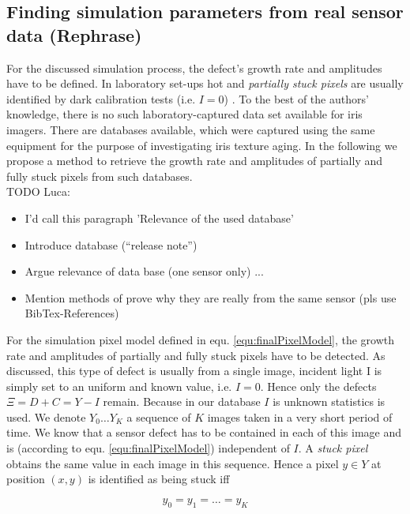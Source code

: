 \documentclass[10pt,twocolumn,letterpaper]{article}
\begin{document}
 
 \subsection{Finding simulation parameters from real sensor data (Rephrase)}
 \label{hotPixelRate}
 For the discussed simulation process, the defect's growth rate and amplitudes have to be defined. In laboratory set-ups hot and \emph{partially stuck pixels} are usually identified by dark calibration tests (i.e. $I=0$) \cite{defectIdentification}. To the best of the authors' knowledge, there is no such laboratory-captured data set available for iris imagers. There are databases \cite{czajkaTemplateAging, agedIris} available, which were captured using the same equipment for the purpose of investigating iris texture aging. In the following we propose a method to retrieve the growth rate and amplitudes of partially and fully stuck pixels from such databases.
 \\
TODO Luca:
\begin{itemize}
 \item I'd call this paragraph 'Relevance of the used database'
 \item Introduce database (``release note'')
 \item Argue relevance of data base (one sensor only) ... 
 \item Mention methods of prove why they are really from the same sensor (pls use BibTex-References)
\end{itemize}

For the simulation pixel model defined in equ. \ref{equ:finalPixelModel}, the growth rate and amplitudes of partially and fully stuck pixels have to be detected. As discussed, this type of defect is usually from a single image, incident light I is simply set to an uniform and known value, i.e. $I=0$. Hence only the defects $\Xi = D+C = Y-I$ remain. Because in our database $I$ is unknown statistics is used.
We denote $Y_0 \dots Y_K$ a sequence of $K$ images taken in a very short period of time. We know that a sensor defect has to be contained in each of this image and is (according to equ. \ref{equ:finalPixelModel}) independent of $I$. A \emph{stuck pixel} obtains the same value in each image in this sequence. Hence a pixel $y \in Y$ at position $(x,y)$ is identified as being stuck iff

\begin{equation}
y_{0} = y_{1} = \dots = y_{K} \label{equ:conditionStuck}
\end{equation}
\end{document}
